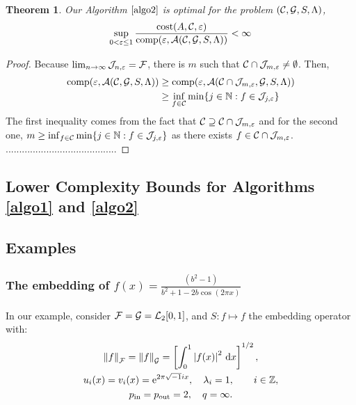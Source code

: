 \documentclass[final]{elsarticle}
\newcommand{\pin}{p_{\text{\rm{in}}}}
\newcommand{\pout}{p_{\text{\rm{out}}}}
\newtheorem{theorem}{Theorem}
\theoremstyle{definition}
\theoremstyle{remark}
\begin{document}
\begin{theorem}\label{optimality}
Our Algorithm $\ref{algo2}$ is optimal for the problem $(\mathcal{C},\mathcal{G},S,\Lambda)$,
\begin{equation*}
\sup_{0 < \varepsilon \le 1}\frac{\operatorname{cost}(A,\mathcal{C},\varepsilon)} {\operatorname{comp}(\varepsilon,\mathcal{A}(\mathcal{C},\mathcal{G},S,\Lambda))} <\infty
\end{equation*}
\end{theorem}
\begin{proof}
Because $\lim_{n\rightarrow\infty}\mathcal{J}_{n,\varepsilon}=\mathcal{F}$, there is $m$ such that $\mathcal{C}\cap\mathcal{J}_{m,\varepsilon}\neq\emptyset$. Then,
\begin{align*}
\operatorname{comp}(\varepsilon,\mathcal{A}(\mathcal{C},\mathcal{G},S,\Lambda))&\ge\operatorname{comp}(\varepsilon,\mathcal{A}(\mathcal{C}\cap\mathcal{J}_{m,\varepsilon},\mathcal{G},S,\Lambda))\\
&\ge\inf_{f\in\mathcal{C}}\min\{j\in\mathbb{N}:f\in\mathcal{J}_{j,\varepsilon}\}
\end{align*}
The first inequality comes from the fact that $\mathcal{C}\supseteq\mathcal{C}\cap\mathcal{J}_{m,\varepsilon}$ and for the second one, $m\ge\inf_{f\in\mathcal{C}}\min\{j\in\mathbb{N}:f\in\mathcal{J}_{j,\varepsilon}\}$ as there exists $f\in\mathcal{C}\cap\mathcal{J}_{m,\varepsilon}$.
.........................................
\end{proof}

\subsection{Lower Complexity Bounds for Algorithms \ref{algo1} and \ref{algo2}}



\subsection{Examples}
\subsubsection{The embedding of $f(x)=\frac{(b^2-1)}{b^2+1-2b\cos(2\pi x)}$}

In our example, consider $\mathcal{F}=\mathcal{G}=\mathcal{L}_2[0,1]$, and $S: f \mapsto f$ the embedding operator with:
\begin{gather*}
\norm[\cf]{f} = \norm[\cg]{f} = \left[\int_0^1 \abs{f(x)}^2 \, \dif x \right]^{1/2}, \\
u_{i}(x) = v_i(x) = \me^{2 \pi \sqrt{-1} i x},\quad \lambda_i=1, \qquad i \in \integers,\\
\pin=\pout=2,\quad q=\infty.
\end{gather*}
\end{document}
